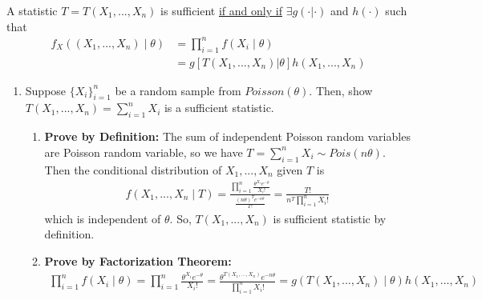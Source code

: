 \documentclass[11pt]{elegantbook}
\begin{document}
\begin{proposition}
    A statistic $T=T(X_1,...,X_n)$ is sufficient \underline{if and only if} $\exists g(\cdot|\cdot)$ and $h(\cdot)$ such that
    \begin{equation}
        \begin{aligned}
            f_X((X_1,...,X_n)\mid \theta)&=\prod_{i=1}^n f(X_i\mid \theta)\\
            &=g[T(X_1,...,X_n)| \theta] h(X_1,...,X_n)
        \end{aligned}
        \nonumber
    \end{equation}
\end{proposition}

\begin{example}\quad
    \begin{enumerate}
        \item Suppose $\{X_i\}_{i=1}^n$ be a random sample from $Poisson(\theta)$. Then, show $T(X_1,...,X_n)=\sum_{i=1}^n X_i$ is a sufficient statistic.
        \begin{enumerate}
            \item \textbf{Prove by Definition:} The sum of independent Poisson random variables are Poisson random variable, so we have $T=\sum_{i=1}^n X_i\sim Pois(n\theta)$. Then the conditional distribution of $X_1,...,X_n$ given $T$ is
            \begin{equation}
                \begin{aligned}
                    f(X_1,...,X_n\mid T)=\frac{\prod_{i=1}^n\frac{\theta^{X_i} e^{-\theta}}{X_i!}}{\frac{(n\theta)^{T} e^{-n\theta}}{T!}}=\frac{T!}{n^T\prod_{i=1}^nX_i!}
                \end{aligned}
                \nonumber
            \end{equation}
            which is independent of $\theta$. So, $T(X_1,...,X_n)$ is sufficient statistic by definition.
            \item \textbf{Prove by Factorization Theorem:}
            \begin{equation}
                \begin{aligned}
                    \prod_{i=1}^n f(X_i\mid\theta)=\prod_{i=1}^n\frac{\theta^{X_i} e^{-\theta}}{X_i!}=\frac{\theta^{T(X_1,...,X_n)} e^{-n\theta}}{\prod_{i=1}^n X_i!}=g(T(X_1,...,X_n)\mid\theta)h(X_1,...,X_n)
                \end{aligned}
                \nonumber
            \end{equation}

\end{enumerate}
\end{enumerate}
\end{example}
\end{document}
